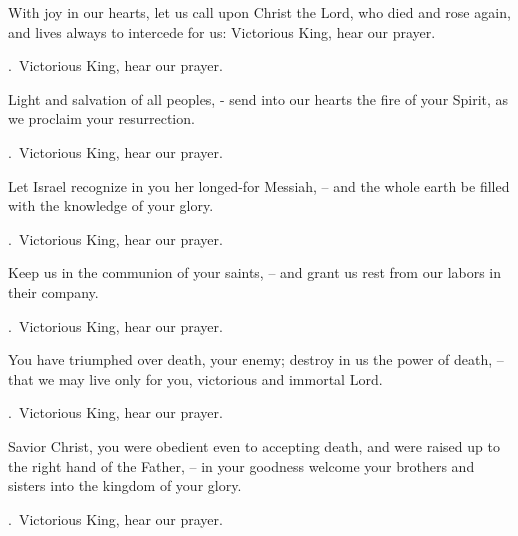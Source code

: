 \lettrine[loversize=0.15,lines=2]{W}{}ith joy in our hearts, let us call upon Christ the Lord, who died and rose again, and lives always to intercede for us: Victorious King, hear our prayer.
\par \Rbar.~Victorious King, hear our prayer.

Light and salvation of all peoples, - send into our hearts the fire of your Spirit, as we proclaim your resurrection.
\par \Rbar.~Victorious King, hear our prayer.

Let Israel recognize in you her longed-for Messiah,
– and the whole earth be filled with the knowledge of your glory.
\par \Rbar.~Victorious King, hear our prayer.

Keep us in the communion of your saints,
– and grant us rest from our labors in their company.
\par \Rbar.~Victorious King, hear our prayer.

You have triumphed over death, your enemy; destroy in us the power of death,
– that we may live only for you, victorious and immortal Lord.
\par \Rbar.~Victorious King, hear our prayer.

Savior Christ, you were obedient even to accepting death, and were raised up to the right hand of the Father,
– in your goodness welcome your brothers and sisters into the kingdom of your glory.
\par \Rbar.~Victorious King, hear our prayer.
